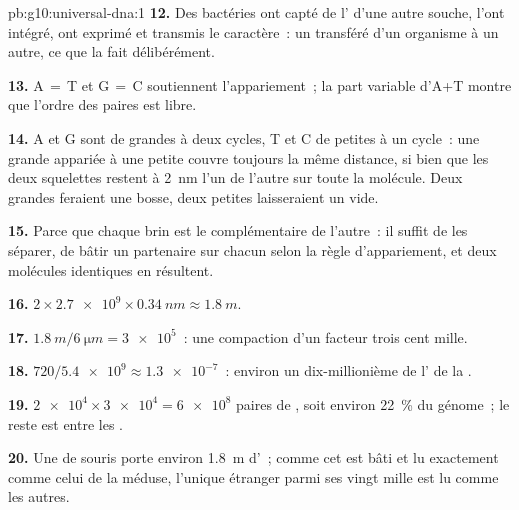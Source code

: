 \begin{solution}{pb:g10:universal-dna:1}
\textbf{12.} Des bactéries ont capté de l' d'une autre souche, l'ont
intégré, ont exprimé et transmis le caractère~: un  transféré d'un
organisme à un autre, ce que la  fait délibérément.

\textbf{13.} A$\,=\,$T et G$\,=\,$C soutiennent l'appariement~; la part
variable d'A+T montre que l'ordre des paires est libre.

\textbf{14.} A et G sont de grandes  à deux cycles, T et C de
petites  à un cycle~: une grande appariée à une petite couvre
toujours la même distance, si bien que les deux squelettes restent à
\qty{2}{nm} l'un de l'autre sur toute la molécule. Deux grandes 
feraient une bosse, deux petites laisseraient un vide.

\textbf{15.} Parce que chaque brin est le complémentaire de l'autre~:
il suffit de les séparer, de bâtir un partenaire sur chacun selon la
règle d'appariement, et deux molécules identiques en résultent.

\textbf{16.} $2 \times \num{2.7e9} \times \qty{0.34}{nm} \approx
\qty{1.8}{m}$.

\textbf{17.} $\qty{1.8}{m} / \qty{6}{\micro m} = \num{3e5}$~: une
compaction d'un facteur trois cent mille.

\textbf{18.} $720 / \num{5.4e9} \approx \num{1.3e-7}$~: environ un
dix-millionième de l' de la .

\textbf{19.} $\num{2e4} \times \num{3e4} = \num{6e8}$ paires de ,
soit environ 22~\% du génome~; le reste est entre les .

\textbf{20.} Une  de souris porte environ \qty{1.8}{m} d'~;
comme cet  est bâti et lu exactement comme celui de la méduse,
l'unique  étranger parmi ses vingt mille est lu comme les autres.
\end{solution}
